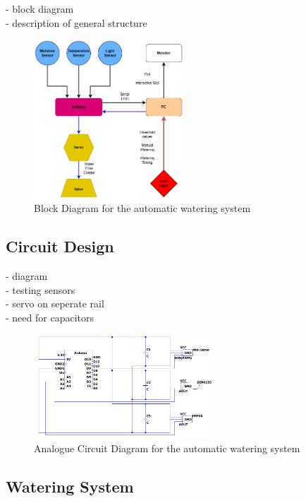 \documentclass[a4paper,11pt]{article}
\begin{document}
- block diagram\\
- description of general structure

\begin{figure}[H]
    \centering
    \includegraphics[width=0.5\textwidth]{DataLogger Block Diagram2.png}
    \caption{Block Diagram for the automatic watering system}
    \label{fig:Block_Diagram_for_the_automatic_watering_system}
\end{figure}

\subsection{Circuit Design}
\label{Cicuit_Design}

- diagram\\
- testing sensors\\
- servo on seperate rail\\ 
- need for capacitors

\begin{figure}[H]
    \centering
    \includegraphics[width=0.6\textwidth]{Analogue Circuit Diagram.png}
    \caption{Analogue Circuit Diagram for the automatic watering system}
    \label{fig:Analogue_Circuit_Diagram_for_the_automatic_watering_system}
\end{figure}

\subsection{Watering System}
\label{sec:Watering_System}
\end{document}
